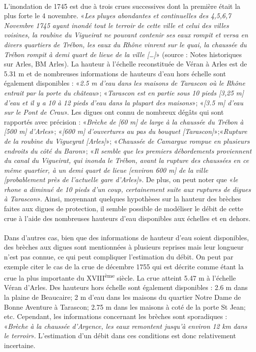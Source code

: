 	\paragraph{} L'inondation de 1745 est due à trois crues successives dont la première était la plus forte le 4 novembre. «\textit{Les pluyes abondantes et continuelles des 4,5,6,7 Novembre 1745 ayant inondé tout le terroir de cette ville et celui des villes voisines, la roubine du Vigueirat ne pouvant contenir ses eaux rompit et versa en divers quartiers de Trébon, les eaux du Rhône vinrent sur le quai, la chaussée du Trébon rompit à demi quart de lieue de la ville […]}» (source : Notes historiques sur Arles, BM Arles). La hauteur à l'échelle reconstituée de Véran à Arles est de 5.31 m et de nombreuses informations de hauteurs d'eau hors échelle sont également disponibles : «\textit{2.5 m d'eau dans les maisons de Tarascon où le Rhône entrait par la porte du château}»; «\textit{Tarascon est en partie sous 10 pieds [3,25 m] d'eau et il y a 10 à 12 pieds d'eau dans la plupart des maisons}»; «\textit{[3.5 m] d'eau sur le Pont de Crau}». Les digues ont connu de nombreux dégâts qui sont rapportés avec précision : «\textit{Brèche de [60 m] de large à la chaussée du Trébon à [500 m] d'Arles}»; «\textit{[600 m] d'ouvertures au pas du bouquet [Tarascon]}»;«\textit{Rupture de la roubine du Vigueyrat [Arles]}»; «\textit{Chaussée de Camargue rompue en plusieurs endroits du côté du Baron}»; «\textit{Il semble que les premiers débordements proviennent du canal du Vigueirat, qui inonda le Trébon, avant la rupture des chaussées en ce même quartier, à un demi quart de lieue [environ 600 m] de la ville [probablement près de l'actuelle gare d’Arles]}». De plus, on peut noter que «\textit{le rhone a diminué de 10 pieds d'un coup, certainement suite aux ruptures de digues à Tarascon}». Ainsi, moyennant quelques hypothèses sur la hauteur des brèches faites aux digues de protection, il semble possible de modéliser le débit de cette crue à l'aide des nombreuses hauteurs d'eau disponibles aux échelles et en dehors. 

	\paragraph{} Dans d'autres cas, bien que des informations de hauteur d'eau soient disponibles, des brèches aux digues sont mentionnées à plusieurs reprises mais leur longueur n'est pas connue, ce qui peut compliquer l'estimation du débit. On peut par exemple citer le cas de la crue de décembre 1755 qui est décrite comme étant la crue la plus importante du XVIII\textsuperscript{ème} siècle. La crue atteint 5.47 m à l'échelle Véran d'Arles. Des hauteurs hors échelle sont également disponibles : 2.6 m dans la plaine de Beaucaire; 2 m d'eau dans les maisons du quartier Notre Dame de Bonne Aventure à Tarascon; 2.75 m dans les maisons à coté de la porte St Jean; etc. Cependant, les informations concernant les brèches sont sporadiques : «\textit{Brèche à la chaussée d'Argence, les eaux remontent jusqu'à environ 12 km dans le terroir}». L'estimation d'un débit dans ces conditions est donc relativement incertaine.
  	
